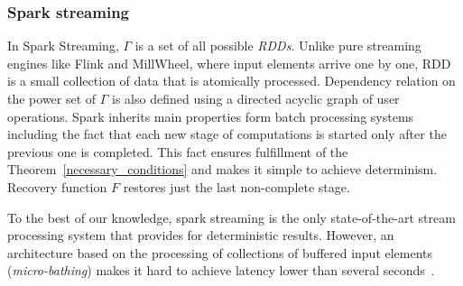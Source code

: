 \subsubsection{Spark streaming}

In Spark Streaming, $\Gamma$ is a set of all possible {\em RDDs}. Unlike pure streaming engines like Flink and MillWheel, where input elements arrive one by one, RDD is a small collection of data that is atomically processed. Dependency relation on the power set of $\Gamma$ is also defined using a directed acyclic graph of user operations. Spark inherits main properties form batch processing systems including the fact that each new stage of computations is started only after the previous one is completed. This fact ensures fulfillment of the Theorem~\ref{necessary_conditions} and makes it simple to achieve determinism. Recovery function $F$ restores just the last non-complete stage.
 
To the best of our knowledge, spark streaming is the only state-of-the-art stream processing system that provides for deterministic results. However, an architecture based on the processing of collections of buffered input elements ({\em micro-bathing}) makes it hard to achieve latency lower than several seconds~\cite{7530084, 7474816}. 
